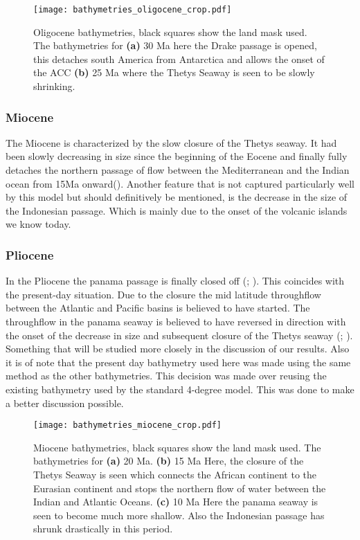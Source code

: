 \begin{figure}[H]
\texttt{[image: bathymetries\_oligocene\_crop.pdf]}
\caption{Oligocene bathymetries, black squares show the land mask used. The bathymetries for \textbf{(a)} 30 Ma here the Drake passage is opened, this detaches south America from Antarctica and allows the onset of the ACC  \textbf{(b)} 25 Ma where the Thetys Seaway is seen to be slowly shrinking.}
\end{figure}
\begin{multicols}{2}
\subsubsection{Miocene}

The Miocene is characterized by the slow closure of the Thetys seaway. It had been slowly decreasing in size since the beginning of the Eocene and finally fully detaches the northern passage of flow between the Mediterranean and the Indian ocean from 15Ma onward(\cite{Hamon2013Nov}). Another feature that is not captured particularly well by this model but should definitively be mentioned, is the decrease in the size of the Indonesian passage. Which is mainly due to the onset of the volcanic islands we know today.

\subsubsection{Pliocene}
In the Pliocene the panama passage is finally closed off (\cite{Molnar2008Jun}; \cite{Pindell1988Dec}). This coincides with the present-day situation. Due to the closure the mid latitude throughflow between the Atlantic and Pacific basins is believed to have started. The throughflow in the panama seaway is believed to have reversed in direction with the onset of the decrease in size and subsequent closure of the Thetys seaway (\cite{von2006effect}; \cite{omta2003physical}). Something that will be studied more closely in the discussion of our results. Also it is of note that the present day bathymetry used here was made using the same method as the other bathymetries. This decision was made over reusing the existing bathymetry used by the standard 4-degree model. This was done to make a better discussion possible. 
\end{multicols}
\begin{figure}[H]
	\texttt{[image: bathymetries\_miocene\_crop.pdf]}
	\caption{Miocene bathymetries, black squares show the land mask used. The bathymetries for \textbf{(a)} 20 Ma. \textbf{(b)} 15 Ma Here, the closure of the Thetys Seaway is seen which connects the African continent to the Eurasian continent and stops the northern flow of water between the Indian and Atlantic Oceans. \textbf{(c)} 10 Ma Here the panama seaway is seen to become much more shallow. Also the Indonesian passage has shrunk drastically in this period.}
\end{figure}
